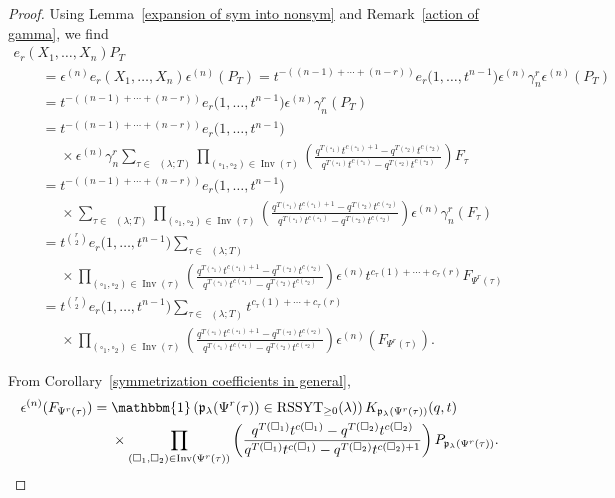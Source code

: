 \documentclass[pdftex]{sigma}
\numberwithin{equation}{section}
\theoremstyle{definition}
\DeclareMathOperator{\PSYT}{\mathrm{PSYT}_{\geq 0}}
\DeclareMathOperator{\RSSYT}{\mathrm{RSSYT}_{\geq 0}}
\DeclareMathOperator{\Inv}{\mathrm{Inv}}
\begin{document}
\begin{proof}
Using Lemma~\ref{expansion of sym into nonsym} and Remark~\ref{action of gamma}, we find
 \begin{gather*}
 e_r(X_1,\dots, X_n)P_T \\
 \qquad = \epsilon^{(n)}e_r(X_1,\dots, X_n)\epsilon^{(n)}(P_T)
 = t^{-((n-1)+\cdots +(n-r))}e_r\bigl(1,\dots, t^{n-1}\bigr)\epsilon^{(n)}\gamma_n^{r} \epsilon^{(n)}(P_T) \\
 \qquad = t^{-((n-1)+\cdots +(n-r))}e_r\bigl(1,\dots, t^{n-1}\bigr)\epsilon^{(n)}\gamma_n^{r}(P_T) \\
 \qquad = t^{-((n-1)+\cdots +(n-r))}e_r\bigl(1,\dots, t^{n-1}\bigr) \\
 \phantom{\qquad =}{} \times \epsilon^{(n)}\gamma_n^{r} \sum_{\tau \in \PSYT(\lambda;T)} \prod_{(\square_1,\square_2) \in \Inv(\tau)} \left( \frac{q^{T(\square_1)}t^{c(\square_1) +1} - q^{T(\square_2)}t^{c(\square_2) }}{q^{T(\square_1)}t^{c(\square_1)} - q^{T(\square_2)}t^{c(\square_2)}} \right) F_{\tau} \\
 \qquad =t^{-((n-1)+\cdots +(n-r))}e_r\bigl(1,\dots, t^{n-1}\bigr) \\
 \phantom{\qquad =}{} \times \sum_{\tau \in \PSYT(\lambda;T)} \prod_{(\square_1,\square_2) \in \Inv(\tau)} \left( \frac{q^{T(\square_1)}t^{c(\square_1) +1} - q^{T(\square_2)}t^{c(\square_2) }}{q^{T(\square_1)}t^{c(\square_1)} - q^{T(\square_2)}t^{c(\square_2)}} \right) \epsilon^{(n)}\gamma_n^{r}(F_{\tau}) \\
 \qquad =t^{r \choose 2}e_r\bigl(1,\dots, t^{n-1}\bigr)\sum_{\tau \in \PSYT(\lambda;T)} \\
 \phantom{\qquad =}{} \times \prod_{(\square_1,\square_2) \in \Inv(\tau)} \left( \frac{q^{T(\square_1)}t^{c(\square_1) +1} - q^{T(\square_2)}t^{c(\square_2) }}{q^{T(\square_1)}t^{c(\square_1)} - q^{T(\square_2)}t^{c(\square_2)}} \right) \epsilon^{(n)}t^{c_{\tau}(1)+\cdots + c_{\tau}(r)} F_{\Psi^{r}(\tau)} \\
 \qquad = t^{r \choose 2}e_r\bigl(1,\dots, t^{n-1}\bigr) \sum_{\tau \in \PSYT(\lambda;T)}t^{c_{\tau}(1)+\cdots + c_{\tau}(r)} \\
 \phantom{\qquad =}{} \times \prod_{(\square_1,\square_2) \in \Inv(\tau)} \left( \frac{q^{T(\square_1)}t^{c(\square_1) +1} - q^{T(\square_2)}t^{c(\square_2) }}{q^{T(\square_1)}t^{c(\square_1)} - q^{T(\square_2)}t^{c(\square_2)}} \right) \epsilon^{(n)}( F_{\Psi^{r}(\tau)}).
 \end{gather*}

 From Corollary~\ref{symmetrization coefficients in general},
\begin{align*}
 \epsilon^{(n)}( F_{\Psi^{r}(\tau)})
 ={}&
 \mathbbm{1}\left(\mathfrak{p}_{\lambda}(\Psi^{r}(\tau)) \in \RSSYT(\lambda)\right) K_{\mathfrak{p}_{\lambda}(\Psi^{r}(\tau))}(q,t) \\
 &\times \prod_{(\square_1,\square_2) \in \Inv(\Psi^{r}(\tau))} \left( \frac{q^{T(\square_1)}t^{c(\square_1) } - q^{T(\square_2)}t^{c(\square_2) }}{q^{T(\square_1)}t^{c(\square_1)} - q^{T(\square_2)}t^{c(\square_2)+1}} \right) P_{\mathfrak{p}_{\lambda}(\Psi^{r}(\tau))}.
\end{align*}



\end{proof}
\end{document}
